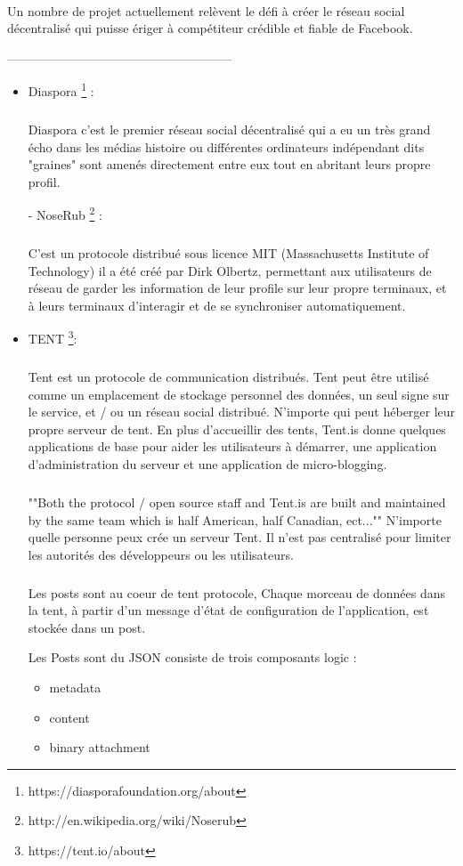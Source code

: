 \paragraph{}
Un nombre de projet actuellement relèvent le défi à créer le réseau social décentralisé qui puisse ériger à compétiteur crédible et fiable de Facebook.
  \begin{center}
------------------------------------------------------
\end{center}
\begin{itemize}
  \item Diaspora \footnote{https://diasporafoundation.org/about} : 
\subparagraph{}
Diaspora c'est le premier réseau social décentralisé qui a eu un très grand écho dans les médias histoire ou différentes ordinateurs indépendant dits "graines" sont amenés directement entre eux tout en abritant leurs propre profil.

- NoseRub \footnote{http://en.wikipedia.org/wiki/Noserub} : 
\subparagraph{}
C'est un protocole distribué sous licence MIT (Massachusetts Institute of Technology) 
il a été créé par Dirk Olbertz, permettant aux utilisateurs de réseau de garder les information de leur profile sur leur propre terminaux, et à leurs terminaux d'interagir et de se synchroniser automatiquement.
  \item TENT \footnote{https://tent.io/about}: 
\subparagraph{}
Tent est un protocole de communication distribués. Tent peut être utilisé comme un emplacement de stockage personnel des données, un seul signe sur le service, et / ou un réseau social distribué. N'importe qui peut héberger leur propre serveur de tent. En plus d'accueillir des tents, Tent.is donne quelques applications de base pour aider les utilisateurs à démarrer, une application d'administration du serveur et une application de micro-blogging.
\subparagraph{}
""Both the protocol / open source staff and Tent.is are built and maintained by the same team which is half American, half Canadian, ect...""
N'importe quelle personne peux crée un serveur Tent. Il n'est pas centralisé pour limiter les autorités des développeurs ou les utilisateurs.
\subparagraph{}
Les posts sont au coeur de tent protocole, Chaque morceau de données dans la tent, à partir d'un message d'état de configuration de l'application, est stockée dans un post.

Les Posts sont du JSON consiste de trois composants logic :
\begin{itemize}
  \item metadata 
 \item content 
 \item binary attachment
\end{itemize}


\end{itemize}
